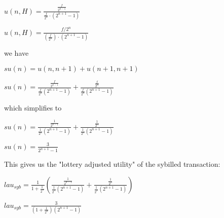 \documentclass[oneside]{article}   	%
\begin{document}
\begin{multicols}{2}
\begin{adjustwidth}{1.5em}{1.5em}
	\begin{math}
u(n,H) = \frac{\frac{f}{2^{n-1}}}{\frac{f}{2^n}\cdot\left(2^{n+1} - 1\right)}
	\end{math}

	\begin{math}
u(n,H) = \frac{f/2^{n}}{\left(\frac{f}{2^n}\right) \cdot \left(2^{n+1} - 1 \right)}
	\end{math}
\end{adjustwidth}
\normalsize

we have

\large
\begin{adjustwidth}{1.5em}{1.5em} 
	\begin{math}
su(n) = u(n, n+1) + u(n+1, n+1)
	\end{math}

	\begin{math}
su(n) =\frac{\frac{f}{2^{n - 1}}}{\frac{f}{2^n} \left(2^{n + 1} - 1 \right)} + \frac{\frac{f}{2^n}}{\frac{f}{2^n} \left(2^{n + 1} - 1 \right)}
	\end{math}
\end{adjustwidth}
\normalsize

which simplifies to

\large
\begin{adjustwidth}{1.5em}{1.5em} 
	\begin{math}
su(n) =\frac{\frac{1}{2^{n - 1}}}{\frac{1}{2^n} \left(2^{n + 1} - 1 \right)} + \frac{\frac{1}{2^n}}{\frac{1}{2^n} \left(2^{n + 1} - 1 \right)}
	\end{math}

	\begin{math}
su(n) = \frac{3}{2^{n+1} - 1}
	\end{math}
\end{adjustwidth}
\normalsize

This gives us the "lottery adjusted utility" of the sybilled transaction:

\large
\begin{adjustwidth}{1.5em}{1.5em} 
	\begin{math}
lau_{syb} = \frac{1}{1+\frac{1}{2^n}} \left(\frac{\frac{1}{2^{n-1}}}{\frac{1}{2^n} \left(2^{n+1}-1\right)} + \frac{\frac{1}{2^n}}{\frac{1}{2^n} \left(2^{n+1}-1\right)}\right)
	\end{math}

	\begin{math}
lau_{syb} = \frac{3}{\left(1 + \frac{1}{2^{n}}\right)\left(2^{n+1}-1\right)}
	\end{math}
\end{adjustwidth}
\normalsize


\end{multicols}
\end{document}
